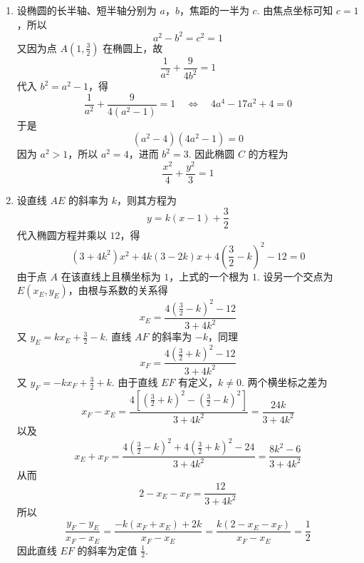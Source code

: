 \begin{solution}
\begin{enumerate}
\item 设椭圆的长半轴、短半轴分别为 \(a\)，\(b\)，焦距的一半为 \(c\). 由焦点坐标可知 \(c=1\)，所以
\[
a^{2}-b^{2}=c^{2}=1
\]
又因为点 \(A\left(1,\frac32\right)\) 在椭圆上，故
\[
\frac{1}{a^{2}}+\frac{9}{4b^{2}}=1
\]
代入 \(b^{2}=a^{2}-1\)，得
\[
\frac{1}{a^{2}}+\frac{9}{4(a^{2}-1)}=1
\quad\Longleftrightarrow\quad
4a^{4}-17a^{2}+4=0
\]
于是
\[
(a^{2}-4)(4a^{2}-1)=0
\]
因为 \(a^{2}>1\)，所以 \(a^{2}=4\)，进而 \(b^{2}=3\). 因此椭圆 \(C\) 的方程为
\[
\frac{x^{2}}{4}+\frac{y^{2}}{3}=1
\]
\item 设直线 \(AE\) 的斜率为 \(k\)，则其方程为
\[
y=k(x-1)+\frac32
\]
代入椭圆方程并乘以 \(12\)，得
\[
(3+4k^{2})x^{2}+4k(3-2k)x+4\left(\frac32-k\right)^{2}-12=0
\]
由于点 \(A\) 在该直线上且横坐标为 \(1\)，上式的一个根为 \(1\). 设另一个交点为 \(E(x_{E},y_{E})\)，由根与系数的关系得
\[
x_{E}=\frac{4\left(\frac32-k\right)^{2}-12}{3+4k^{2}}
\]
又 \(y_{E}=kx_{E}+\frac32-k\).
直线 \(AF\) 的斜率为 \(-k\)，同理
\[
x_{F}=\frac{4\left(\frac32+k\right)^{2}-12}{3+4k^{2}}
\]
又 \(y_{F}=-kx_{F}+\frac32+k\).
由于直线 \(EF\) 有定义，\(k\neq0\). 两个横坐标之差为
\[
x_{F}-x_{E}
=\frac{4\left[\left(\frac32+k\right)^{2}-\left(\frac32-k\right)^{2}\right]}{3+4k^{2}}
=\frac{24k}{3+4k^{2}}
\]
以及
\[
x_{E}+x_{F}
=\frac{4\left(\frac32-k\right)^{2}+4\left(\frac32+k\right)^{2}-24}{3+4k^{2}}
=\frac{8k^{2}-6}{3+4k^{2}}
\]
从而
\[
2-x_{E}-x_{F}=\frac{12}{3+4k^{2}}
\]
所以
\[
\frac{y_{F}-y_{E}}{x_{F}-x_{E}}
=\frac{-k(x_{F}+x_{E})+2k}{x_{F}-x_{E}}
=\frac{k(2-x_{E}-x_{F})}{x_{F}-x_{E}}
=\frac12
\]
因此直线 \(EF\) 的斜率为定值 \(\frac12\).
\end{enumerate}
\end{solution}
